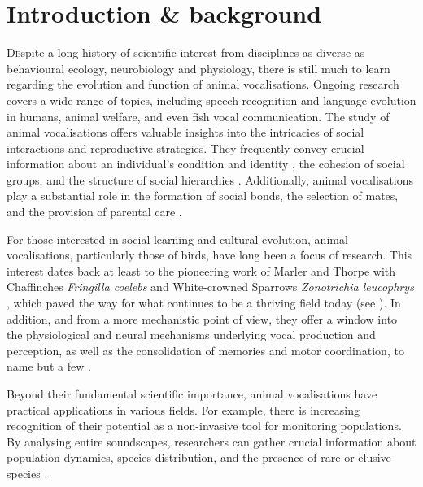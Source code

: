 \section{Introduction \& background}
\lettrine[lines=2,slope=0pt, nindent=5pt]Despite a long history of scientific interest from disciplines as diverse as behavioural ecology, neurobiology and physiology, there is still much to learn regarding the evolution and function of animal vocalisations. Ongoing research covers a wide range of topics, including speech recognition and language evolution in humans, animal welfare, and even fish vocal communication. The study of animal vocalisations offers valuable insights into the intricacies of social interactions and reproductive strategies. They frequently convey crucial information about an individual's condition and identity \parencite{lehmann2017, linhart2019}, the cohesion of social groups, and the structure of social hierarchies \parencite{bell2010, engesser2022, radford2007}. Additionally, animal vocalisations play a substantial role in the formation of social bonds, the selection of mates, and the provision of parental care \parencite{behr2004, gerhardt1991, pitcher2010, roulin2001}.

For those interested in social learning and cultural evolution, animal vocalisations, particularly those of birds, have long been a focus of research. This interest dates back at least to the pioneering work of Marler and Thorpe with Chaffinches \textit{Fringilla coelebs} and White-crowned Sparrows \textit{Zonotrichia leucophrys} \parencite{marler1964, Marler1962, marler1952, thorpe1958}, which paved the way for what continues to be a thriving field today (see \cite{mets2019, riebel2015, williams2021, youngblood2022}). In addition, and from a more mechanistic point of view, they offer a window into the physiological and neural mechanisms underlying vocal production and perception, as well as the consolidation of memories and motor coordination, to name but a few \parencite{davenport2023}. 

Beyond their fundamental scientific importance, animal vocalisations have practical applications in various fields. For example, there is increasing recognition of their potential as a non-invasive tool for monitoring populations. By analysing entire soundscapes, researchers can gather crucial information about population dynamics, species distribution, and the presence of rare or elusive species \parencite{kahl2021, sethi2020, sugai2019}.

